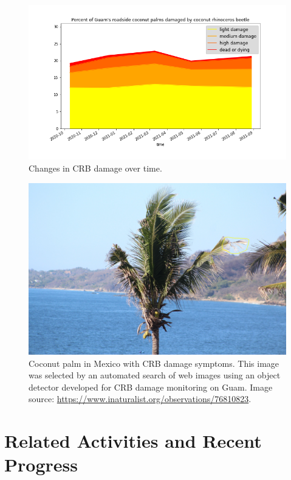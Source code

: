 \documentclass[12pt,letterpaper,english,bibliography=totocnumbered, abstract=on]{scrartcl}
\begin{document}
\begin{figure}[H]
	\centering
	\includegraphics[width=\linewidth]{images/timeline-2021-08}
	\caption{Changes in CRB damage over time.}
	\label{fig:timeline-2021-08}
\end{figure}

\begin{figure}[H]
	\centering
	\includegraphics[width=\linewidth]{images/crb-mexico}
	\caption{Coconut palm in Mexico with CRB damage symptoms. This image was selected by an automated search of web images using an object detector developed for CRB damage monitoring on Guam. Image source: \url{https://www.inaturalist.org/observations/76810823}.}
	\label{fig:crb-mexico}
\end{figure}

\clearpage

\section{Related Activities and Recent Progress}
\end{document}
